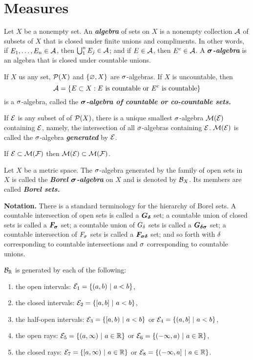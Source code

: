 \section{Measures}
\setcounter{thm}{0}

\dfn Let $X$ be a nonempty set. An \textbf{\textit{algebra}} of sets on $X$ is a nonempty collection $\mathcal{A}$ of subsets of $X$ that is closed under finite unions and compliments. In other words, if $E_1,\ldots,E_n\in \mathcal{A}$, then $\bigcup_1^n E_j\in \mathcal{A}$; and if $E\in \mathcal{A}$, then $E^c\in\mathcal{A}$. A $\boldsymbol{\sigma}$\textbf{\textit{-algebra}} is an algebra that is closed under countable unions. 

\dfn If $X$ us any set, $\mathcal{P}(X)$ and $\{\varnothing, X\}$ are $\sigma$-algebras. If $X$ is uncountable, then
\[\mathcal{A} = \{E\subset X: E\text{ is countable or $E^c$ is countable}\}\]
is a $\sigma$-algebra, called the \textbf{\textit{$\boldsymbol{\sigma}$-algebra of countable or co-countable sets.}}

\dfn If $\mathcal{E}$ is any subset of of $\mathcal{P}(X)$, there is a unique smallest $\sigma$-algebra $\mathcal{M}(\mathcal{E})$ containing $\mathcal{E}$, namely, the intersection of all $\sigma$-algebras containing $\mathcal{E}$. $\mathcal{M}(\mathcal{E})$ is called the $\sigma$-algebra \textbf{\textit{generated}} by $\mathcal{E}$.\\


\begin{lem}
If $\mathcal{E}\subset\mathcal{M}(\mathcal{F})$ then $\mathcal{M}(\mathcal{E})\subset \mathcal{M}(\mathcal{F})$.
\end{lem}

\vs

\dfn Let $X$ be a metric space. The $\sigma$-algebra generated by the family of open sets in $X$ is called the \textbf{\textit{Borel $\boldsymbol{\sigma}$-algebra}} on $X$ and is denoted by $\mathcal{B}_X$. Its members are called \textbf{\textit{Borel sets.}}

\textbf{Notation.} There is a standard terminology for the hierarchy of Borel sets. A countable intersection of open sets is called a $\boldsymbol{G_\delta}$ set; a countable union of closed sets is called a $\boldsymbol{F_\sigma}$ set; a countable union of $G_\delta$ sets is called a $\boldsymbol{G_{\delta\sigma}}$ set; a countable intersection of $F_\sigma$ sets is called a $\boldsymbol{F_{\sigma\delta}}$ set; and so forth with $\delta$ corresponding to countable intersections and $\sigma$ corresponding to countable unions.\\

\begin{prop}
$\mathcal{B}_{\mathbb{R}}$ is generated by each of the following:
\begin{enumerate}
\item the open intervals: $\EE_1 = \{(a,b)\ |\ a < b\}$,
\item the closed intervals: $\EE_2 = \{[a,b]\ |\ a < b\}$,
\item the half-open intervals: $\mathcal{E}_3 = \{[a,b)\ |\ a < b\}$ or $\mathcal{E}_4 = \{(a,b]\ |\ a < b\}$,
\item the open rays: $\EE_5 = \{(a,\infty)\ |\ a \in \R\}$ or $\mathcal{E}_6 = \{(-\infty,a)\ |\ a \in \mathbb{R}\}$,
\item the closed rays: $\EE_7 = \{[a,\infty)\ |\ a \in \R\}$ or $\mathcal{E}_8 = \{(-\infty,a]\ |\ a \in \mathbb{R}\}$.
\end{enumerate}
\end{prop}

